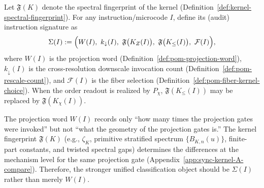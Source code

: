 \begin{definition}\label{def:pom-instruction-signature}
Let $\mathfrak{F}(K)$ denote the spectral fingerprint of the kernel (Definition~\ref{def:kernel-spectral-fingerprint}). For any instruction/microcode $I$, define its (audit) instruction signature as
$$
\Sigma(I):=\Bigl(W(I),\ k_{\downarrow}(I),\ \mathfrak{F}\bigl(K_Z(I)\bigr),\ \mathfrak{F}\bigl(K_{\le}(I)\bigr),\ \mathcal{F}(I)\Bigr),
$$
where $W(I)$ is the projection word (Definition~\ref{def:pom-projection-word}), $k_{\downarrow}(I)$ is the cross-resolution downscale invocation count (Definition~\ref{def:pom-rescale-count}), and $\mathcal{F}(I)$ is the fiber selection (Definition~\ref{def:pom-fiber-kernel-choice}). When the order readout is realized by $P_\chi$, $\mathfrak{F}(K_{\le}(I))$ may be replaced by $\mathfrak{F}(K_{\chi}(I))$.
\end{definition}

\begin{remark}\label{rem:pom-signature-why}
The projection word $W(I)$ records only ``how many times the projection gates were invoked'' but not ``what the geometry of the projection gates is.'' The kernel fingerprint $\mathfrak{F}(K)$ (e.g., $\zeta_K$, primitive stratified spectrum $\{B_{K,n}(u)\}$, finite-part constants, and twisted spectral gaps) determines the differences at the mechanism level for the same projection gate (Appendix~\ref{app:sync-kernel-A-compare}). Therefore, the stronger unified classification object should be $\Sigma(I)$ rather than merely $W(I)$.
\end{remark}

